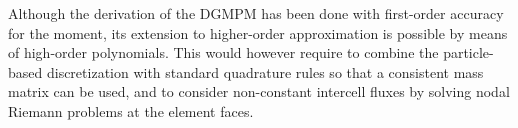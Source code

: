 \documentclass[AMA,STIX1COL]{WileyNJD-v2}
\renewcommand{\(}{\left(}
\renewcommand{\)}{\right)}
\renewcommand{\[}{\left[}
\renewcommand{\]}{\right]}
\newcommand{\review}[1]{\color{Blue}#1\color{black}}
\begin{document}

\review{
  Although the derivation of the DGMPM has been done with first-order accuracy for the moment, its extension to higher-order approximation is possible by means of high-order polynomials.
  This would however require to combine the particle-based discretization with standard quadrature rules so that a consistent mass matrix can be used, and to consider non-constant intercell fluxes by solving nodal Riemann problems at the element faces.
}
%
\end{document}
